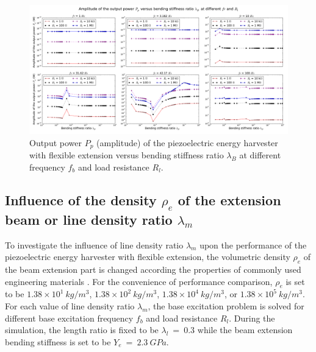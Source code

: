 \documentclass{elsarticle}
\begin{document}
\begin{figure}[!htbp]
    \centering
    \includegraphics[width=\textwidth]{./fig_pow_fr_sl_Rl_sl_vs_lamB}
    \caption{Output power $P_p$ (amplitude) of the piezoelectric energy harvester with flexible extension versus bending stiffness ratio $\lambda_B$ at different frequency $f_b$ and load resistance $R_l$. }
    \label{fig:fig_pow_fr_sl_Rl_sl_vs_lamB}
\end{figure}


\subsection{Influence of the density $\rho_e$ of the extension beam or line density ratio $\lambda_m$}

To investigate the influence of line density ratio $\lambda_m$ upon the performance of the piezoelectric energy harvester with flexible extension, the volumetric density $\rho_e$ of the beam extension part is changed according the properties of commonly used engineering materials \cite{warlimont2018springer}. For the convenience of performance comparison, $\rho_e$ is set to be $1.38\times10^1\ kg/m^3$, $1.38\times10^2\ kg/m^3$, $1.38\times10^4\ kg/m^3$, or $1.38\times10^5\ kg/m^3$. For each value of line density ratio $\lambda_m$, the base excitation problem is solved for different base excitation frequency $f_b$ and load resistance $R_l$. During the simulation, the length ratio is fixed to be $\lambda_l\ =\ 0.3$ while the beam extension bending stiffness is set to be $Y_e\ =\ 2.3\ GPa$.
\end{document}
